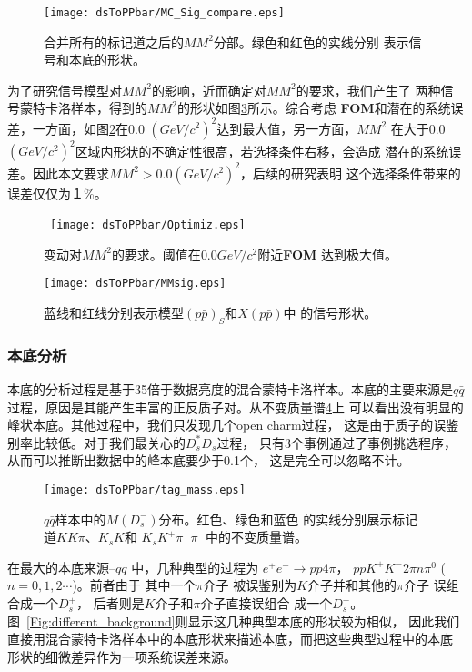 \begin{figure}[htbp]
    \centering
    \texttt{[image: dsToPPbar/MC\_Sig\_compare.eps]}
    \caption{合并所有的标记道之后的$MM^{2}$分部。绿色和红色的实线分别
    表示信号和本底的形状。
    }\label{fig:MC_Sig_compare}
\end{figure}
为了研究信号模型对$MM^{2}$的影响，近而确定对$MM^{2}$的要求，我们产生了
两种信号蒙特卡洛样本，得到的$MM^{2}$的形状如图\ref{fig:MM_model}所示。综合考虑
\textbf{FOM}和潜在的系统误差，一方面，如图\ref{fig:FOM}在0.0
${(GeV/c^{2})}^{2}$达到最大值，另一方面，$MM^{2}$ 在大于0.0 
${(GeV/c^{2})}^{2}$区域内形状的不确定性很高，若选择条件右移，会造成
潜在的系统误差。因此本文要求$MM^{2} >0.0{(GeV/c^{2})}^{2}$，后续的研究表明
这个选择条件带来的误差仅仅为１\%。
\begin{figure}[htbp]
    \begin{center}
    \mbox{%
        \texttt{[image: dsToPPbar/Optimiz.eps]}
    }
    \end{center}
    \caption{变动对$MM^{2}$的要求。阈值在$0.0 GeV/c^{2}$附近\textbf{FOM}
    达到极大值。
    }\label{fig:FOM}
\end{figure}
\begin{figure}[htbp]%
    \centering
    \texttt{[image: dsToPPbar/MMsig.eps]}
    \caption{蓝线和红线分别表示模型${(p\bar{p})}_{S}$和$X(p\bar{p})$中
    的信号形状。
    }\label{fig:MM_model}
\end{figure}

\subsubsection{本底分析}
本底的分析过程是基于35倍于数据亮度的混合蒙特卡洛样本。本底的主要来源是$q\bar{q}$
过程，原因是其能产生丰富的正反质子对。从不变质量谱\ref{fig:qq_bkg}上
可以看出没有明显的峰状本底。其他过程中，我们只发现几个open charm过程，
这是由于质子的误鉴别率比较低。对于我们最关心的$D_{s}^{*}D_{s}$过程，
只有3个事例通过了事例挑选程序，从而可以推断出数据中的峰本底要少于0.1个，
这是完全可以忽略不计。
\begin{figure}[htbp]
    \begin{center}
        \texttt{[image: dsToPPbar/tag\_mass.eps]}
    \end{center}
    \caption{$q\bar{q}$样本中的$M(D_{s}^{-})$分布。红色、绿色和蓝色
    的实线分别展示标记道$KK\pi$、$K_{s}K$和
    $K_{s} K^{+} \pi^{-}\pi^{-}$中的不变质量谱。
    }\label{fig:qq_bkg}
\end{figure}
在最大的本底来源--$q\bar{q}$ 中，几种典型的过程为
$e^{+}e^{-} \rightarrow p \bar{p} 4\pi$， 
$p \bar{p} K^{+} K^{-} 2\pi n\pi^{0}$ ($n=0,1,2\cdots$)。前者由于
其中一个$\pi$介子 被误鉴别为$K$介子并和其他的$\pi$介子
误组合成一个$D_{s}^{+}$， 后者则是$K$介子和$\pi$介子直接误组合
成一个$D_{s}^{+}$。
图~\ref{Fig:different_background}则显示这几种典型本底的形状较为相似，
因此我们直接用混合蒙特卡洛样本中的本底形状来描述本底，而把这些典型过程中的本底
形状的细微差异作为一项系统误差来源。


